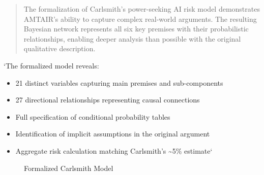 \documentclass[
  11pt,
  letterpaper,
]{book}
\providecommand{\tightlist}{%
  \setlength{\itemsep}{0pt}\setlength{\parskip}{0pt}}
\begin{document}
\begin{quote}
The formalization of Carlsmith's power-seeking AI risk model
demonstrates AMTAIR's ability to capture complex real-world arguments.
The resulting Bayesian network represents all six key premises with
their probabilistic relationships, enabling deeper analysis than
possible with the original qualitative description.
\end{quote}

`The formalized model reveals:

\begin{itemize}
\tightlist
\item
  21 distinct variables capturing main premises and sub-components
\item
  27 directional relationships representing causal connections
\item
  Full specification of conditional probability tables
\item
  Identification of implicit assumptions in the original argument
\item
  Aggregate risk calculation matching Carlsmith's \textasciitilde5\%
  estimate`
\end{itemize}

\begin{figure}


\caption{\label{fig-carlsmith-model}Formalized Carlsmith Model}

\end{figure}%
\end{document}
